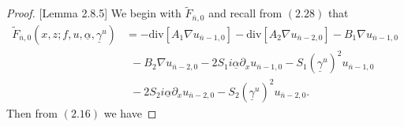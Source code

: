 \vskip 0.1in
\begin{proof}{[Lemma 2.8.5]} We begin with $\tilde{F}_{\overline{n},0}$ and recall from $(2.28)$ that
\begin{align}\tilde{F}_{\overline{n},0}\left(x,z;f,u,\underline{\alpha},\underline{\gamma}^u\right)&=-\text{div}[A_1\nabla u_{\overline{n}-1,0}]-\text{div}[A_2\nabla u_{\overline{n}-2,0}]-B_1\nabla u_{\overline{n}-1,0} \nonumber
\\&~~- B_2\nabla u_{\overline{n}-2,0}-2S_1i\underline{\alpha}\partial_xu_{\overline{n}-1,0}-S_1(\underline{\gamma}^u)^2u_{\overline{n}-1,0}
\\&~~-2S_2i\underline{\alpha}\partial_xu_{\overline{n}-2,0}-S_2(\underline{\gamma}^u)^2u_{\overline{n}-2,0}.\nonumber\end{align}
Then from $(2.16)$ we have


\end{proof}
